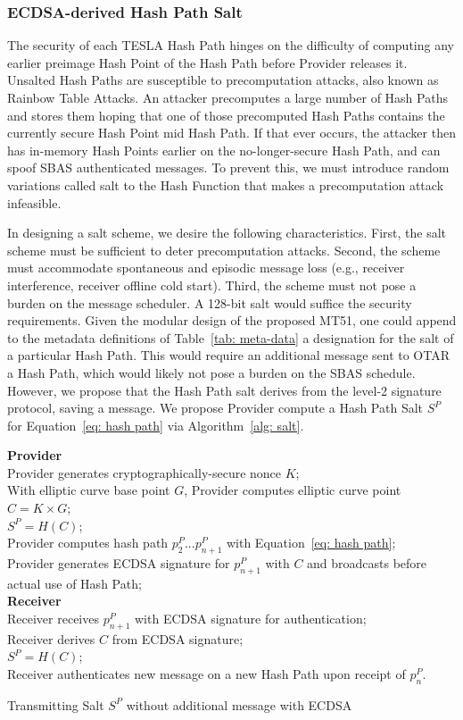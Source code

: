 \documentclass[letterpaper,times]{IONconf/IONconf}
\begin{document}
		\subsubsection{ECDSA-derived Hash Path Salt} \label{subsub:ecdsa_salt}

			The security of each TESLA Hash Path hinges on the difficulty of computing any earlier preimage Hash Point of the Hash Path before Provider releases it.
			Unsalted Hash Paths are susceptible to precomputation attacks, also known as Rainbow Table Attacks.
			An attacker precomputes a large number of Hash Paths and stores them hoping that one of those precomputed Hash Paths contains the currently secure Hash Point mid Hash Path.
			If that ever occurs, the attacker then has in-memory Hash Points earlier on the no-longer-secure Hash Path, and can spoof SBAS authenticated messages.
			To prevent this, we must introduce random variations called salt to the Hash Function that makes a precomputation attack infeasible.

			In designing a salt scheme, we desire the following characteristics.
			First, the salt scheme must be sufficient to deter precomputation attacks.
			Second, the scheme must accommodate spontaneous and episodic message loss (e.g., receiver interference, receiver offline cold start).
			Third, the scheme must not pose a burden on the message scheduler.
			A 128-bit salt would suffice the security requirements.
			Given the modular design of the proposed MT51, one could append to the metadata definitions of Table~\ref{tab: meta-data} a designation for the salt of a particular Hash Path.
			This would require an additional message sent to OTAR a Hash Path, which would likely not pose a burden on the SBAS schedule.
			However, we propose that the Hash Path salt derives from the level-2 signature protocol, saving a message.
			We propose Provider compute a Hash Path Salt $S^P$ for Equation~\eqref{eq: hash path} via Algorithm~\ref{alg: salt}.

			\begin{algorithm}%
				\SetAlgoLined
				{\bf Provider} \\
				Provider generates cryptographically-secure nonce $K$; \\
				With elliptic curve base point $G$, Provider computes elliptic curve point $C = K \times G$; \\
				$S^P = H(C)$; \\
				Provider computes hash path $p^P_2 ... p^P_{n+1}$ with Equation~\eqref{eq: hash path}; \\
				Provider generates ECDSA signature for $p^P_{n+1}$ with $C$ and broadcasts before actual use of Hash Path; \\
				{\bf Receiver} \\
				Receiver receives $p^P_{n+1}$ with ECDSA signature for authentication; \\
				Receiver derives $C$ from ECDSA signature; \\
				$S^P = H(C)$; \\
				Receiver authenticates new message on a new Hash Path upon receipt of $p^P_n$.
				\caption{Transmitting Salt $S^P$ without additional message with ECDSA}
				\label{alg: salt}
			\end{algorithm}
\end{document}

